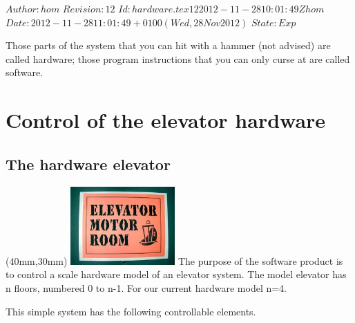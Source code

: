 \renewcommand\TheFile{hardware.tex}
\SVN $Author: hom $
\SVN $Revision: 12 $
\SVN $Id: hardware.tex 12 2012-11-28 10:01:49Z hom $
\SVN $Date: 2012-11-28 11:01:49 +0100 (Wed, 28 Nov 2012) $
\SVN $State: Exp $
\begin{savequote}[8cm]
  \sffamily
  Those parts of the system that you can hit with a hammer (not
  advised) are called hardware; those program instructions that you
  can only curse at are called software.
\end{savequote}
\chapter{Control of the elevator hardware}

\section{The hardware elevator}
\parpic(40mm,30mm){
  \includegraphics[width=40mm]{figures/elevatormotorroom.jpeg}}
The purpose of the software product is to control a scale
hardware model of an elevator system. The model elevator has n floors,
numbered 0 to n-1. For our current hardware model n=4.

This simple system has the following controllable elements.

